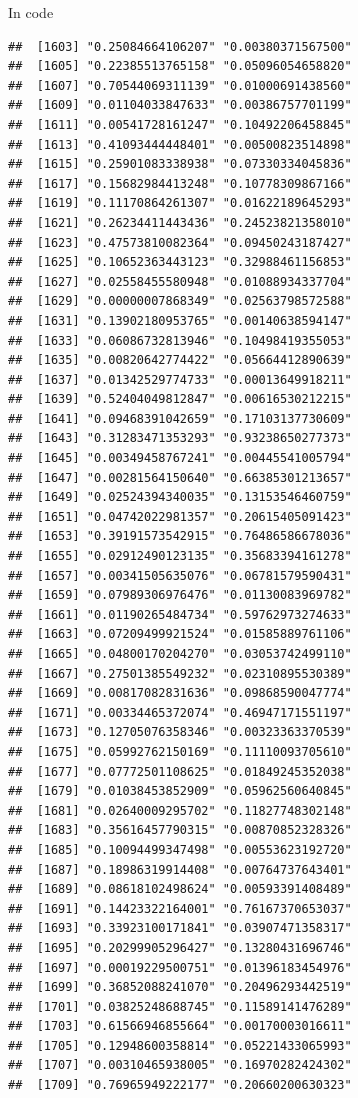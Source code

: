 \documentclass[ignorenonframetext,]{beamer}
\begin{document}
\begin{frame}[fragile]{In code}
\begin{verbatim}
##  [1603] "0.25084664106207" "0.00380371567500"
##  [1605] "0.22385513765158" "0.05096054658820"
##  [1607] "0.70544069311139" "0.01000691438560"
##  [1609] "0.01104033847633" "0.00386757701199"
##  [1611] "0.00541728161247" "0.10492206458845"
##  [1613] "0.41093444448401" "0.00500823514898"
##  [1615] "0.25901083338938" "0.07330334045836"
##  [1617] "0.15682984413248" "0.10778309867166"
##  [1619] "0.11170864261307" "0.01622189645293"
##  [1621] "0.26234411443436" "0.24523821358010"
##  [1623] "0.47573810082364" "0.09450243187427"
##  [1625] "0.10652363443123" "0.32988461156853"
##  [1627] "0.02558455580948" "0.01088934337704"
##  [1629] "0.00000007868349" "0.02563798572588"
##  [1631] "0.13902180953765" "0.00140638594147"
##  [1633] "0.06086732813946" "0.10498419355053"
##  [1635] "0.00820642774422" "0.05664412890639"
##  [1637] "0.01342529774733" "0.00013649918211"
##  [1639] "0.52404049812847" "0.00616530212215"
##  [1641] "0.09468391042659" "0.17103137730609"
##  [1643] "0.31283471353293" "0.93238650277373"
##  [1645] "0.00349458767241" "0.00445541005794"
##  [1647] "0.00281564150640" "0.66385301213657"
##  [1649] "0.02524394340035" "0.13153546460759"
##  [1651] "0.04742022981357" "0.20615405091423"
##  [1653] "0.39191573542915" "0.76486586678036"
##  [1655] "0.02912490123135" "0.35683394161278"
##  [1657] "0.00341505635076" "0.06781579590431"
##  [1659] "0.07989306976476" "0.01130083969782"
##  [1661] "0.01190265484734" "0.59762973274633"
##  [1663] "0.07209499921524" "0.01585889761106"
##  [1665] "0.04800170204270" "0.03053742499110"
##  [1667] "0.27501385549232" "0.02310895530389"
##  [1669] "0.00817082831636" "0.09868590047774"
##  [1671] "0.00334465372074" "0.46947171551197"
##  [1673] "0.12705076358346" "0.00323363370539"
##  [1675] "0.05992762150169" "0.11110093705610"
##  [1677] "0.07772501108625" "0.01849245352038"
##  [1679] "0.01038453852909" "0.05962560640845"
##  [1681] "0.02640009295702" "0.11827748302148"
##  [1683] "0.35616457790315" "0.00870852328326"
##  [1685] "0.10094499347498" "0.00553623192720"
##  [1687] "0.18986319914408" "0.00764737643401"
##  [1689] "0.08618102498624" "0.00593391408489"
##  [1691] "0.14423322164001" "0.76167370653037"
##  [1693] "0.33923100171841" "0.03907471358317"
##  [1695] "0.20299905296427" "0.13280431696746"
##  [1697] "0.00019229500751" "0.01396183454976"
##  [1699] "0.36852088241070" "0.20496293442519"
##  [1701] "0.03825248688745" "0.11589141476289"
##  [1703] "0.61566946855664" "0.00170003016611"
##  [1705] "0.12948600358814" "0.05221433065993"
##  [1707] "0.00310465938005" "0.16970282424302"
##  [1709] "0.76965949222177" "0.20660200630323"

\end{verbatim}
\end{frame}
\end{document}
